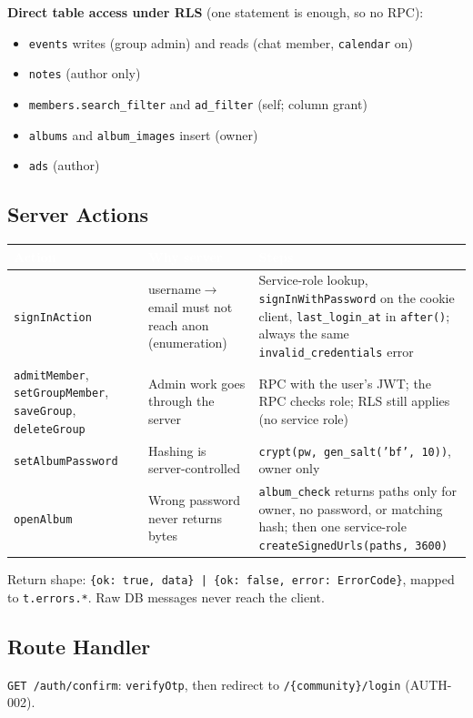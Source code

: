 \documentclass[11pt,a4paper]{article}
\newcommand{\hdr}[1]{\textcolor{white}{\textbf{#1}}}
\newcommand{\code}[1]{\texttt{\small #1}}
\begin{document}
\textbf{Direct table access under RLS} (one statement is enough, so no RPC):
\begin{itemize}
  \item \code{events} writes (group admin) and reads (chat member, \code{calendar} on)
  \item \code{notes} (author only)
  \item \code{members.search\_filter} and \code{ad\_filter} (self; column grant)
  \item \code{albums} and \code{album\_images} insert (owner)
  \item \code{ads} (author)
\end{itemize}

\subsection{Server Actions}
{\small
{}
\begin{longtable}{L{3.4cm} L{4.6cm} L{7cm}}
\hdr{Action} & \hdr{Why server} & \hdr{Steps}\\
\endhead
\code{signInAction} & username$\rightarrow$email must not reach anon (enumeration) & Service-role lookup, \code{signInWithPassword} on the cookie client, \code{last\_login\_at} in \code{after()}; always the same \code{invalid\_credentials} error\\
\code{admitMember}, \code{setGroupMember}, \code{saveGroup}, \code{deleteGroup} & Admin work goes through the server & RPC with the user's JWT; the RPC checks role; RLS still applies (no service role)\\
\code{setAlbumPassword} & Hashing is server-controlled & \code{crypt(pw, gen\_salt('bf', 10))}, owner only\\
\code{openAlbum} & Wrong password never returns bytes & \code{album\_check} returns paths only for owner, no password, or matching hash; then one service-role \code{createSignedUrls(paths, 3600)}\\
\end{longtable}
}
Return shape: \code{\{ok: true, data\} | \{ok: false, error: ErrorCode\}}, mapped to \code{t.errors.*}. Raw DB
messages never reach the client.

\subsection{Route Handler}
\code{GET /auth/confirm}: \code{verifyOtp}, then redirect to \code{/\{community\}/login} (AUTH-002).
\end{document}
